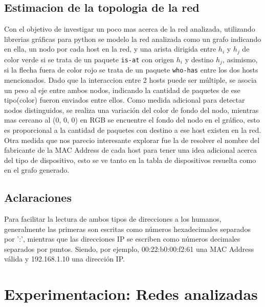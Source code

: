 \subsection{Estimacion de la topologia de la red}
Con el objetivo de investigar un poco mas acerca de la red analizada, utilizando librerias gr\'aficas para python se modelo la red analizada como un grafo indicando en ella, un nodo por cada host en la red, y una arista dirigida entre $h_i$ y $h_j$ de color {\color{green}verde} si se trata de un paquete \texttt{is-at} con origen $h_i$ y destino $h_j$, asimismo, si la flecha fuera de color {\color{red}rojo} se trata de un paquete \texttt{who-has} entre los dos hosts mencionados. Dado que la interaccion entre 2 hosts puede ser m\'ultiple, se asocia un peso al eje entre ambos nodos, indicando la cantidad de paquetes de ese tipo(color) fueron enviados entre ellos. Como medida adicional para detectar nodos distinguidos, se realiza una variaci\'on del color de fondo del nodo, mientras mas cercano al (0, 0, 0) en RGB se encuentre el fondo del nodo en el gr\'afico, esto es proporcional a la cantidad de paquetes con destino a ese host existen en la red. Otra medida que nos parecio interesante explorar fue la de resolver el nombre del fabricante de la MAC Address de cada host para tener una idea adicional acerca del tipo de dispositivo, esto se ve tanto en la tabla de dispositivos resuelta como en el grafo generado.

\subsection{Aclaraciones}
Para facilitar la lectura de ambos tipos de direcciones a los humanos, generalmente las primeras son escritas como números hexadecimales separados por ':', mientras que las direcciones IP se escriben como números decimales separados por puntos. Siendo, por ejemplo, 00:22:b0:00:f2:61 una MAC Address válida y 192.168.1.10 una dirección IP.

\section{Experimentacion: Redes analizadas}
 
 
% 
% 
 

